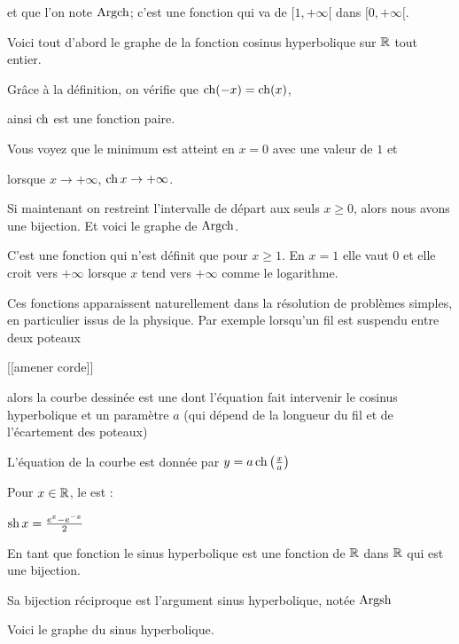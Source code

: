 et que l'on note $\mathop{\mathrm{Argch}}\nolimits$; c'est une fonction qui va de $[1,+\infty[$ 
dans $[0,+\infty[$.


\change


Voici tout d'abord le graphe de la fonction cosinus hyperbolique 
sur $\mathbb{R}$
tout entier.

Grâce à la définition, on vérifie que $\mathop{\mathrm{ch}}\nolimits(-x)=\mathop{\mathrm{ch}}\nolimits(x)$,

ainsi $\mathop{\mathrm{ch}}\nolimits$ est une fonction paire. 

Vous voyez que le minimum est atteint en $x=0$ avec une valeur de $1$ et 

lorsque $x\to+\infty$, $\mathop{\mathrm{ch}}\nolimits x \to +\infty$.



\change

Si maintenant on restreint l'intervalle de départ aux seuls $x\ge0$,
alors nous avons une bijection.
Et voici le graphe de $\mathop{\mathrm{Argch}}\nolimits$.

C'est une fonction qui n'est définit que pour $x\ge 1$.
En $x=1$ elle vaut $0$ et elle croit vers $+\infty$ 
lorsque $x$ tend vers $+\infty$
comme le logarithme.


\diapo

Ces fonctions apparaissent naturellement dans la résolution de 
problèmes simples, en particulier issus de la physique.
Par exemple lorsqu'un fil est suspendu entre deux poteaux 

[[amener corde]]

alors la courbe dessinée est une  
dont l'équation fait intervenir le cosinus hyperbolique
et un paramètre $a$ 
(qui dépend de la longueur du fil et de l'écartement des poteaux)

L'équation de la courbe est donnée par 
$y = a\mathop{\mathrm{ch}}\nolimits \left( \frac x a \right)$


\diapo

Pour $x\in \mathbb{R}$, le  est :

$\mathop{\mathrm{sh}}\nolimits x = \frac{e^x-e^{-x}}{2}$

\change

En tant que fonction le sinus hyperbolique est une fonction de $\mathbb{R}$ dans 
$\mathbb{R}$ qui est une bijection.

\change

Sa bijection réciproque est l'argument sinus hyperbolique, 
notée $\mathop{\mathrm{Argsh}}\nolimits$ 


\change

Voici le graphe du sinus hyperbolique.


